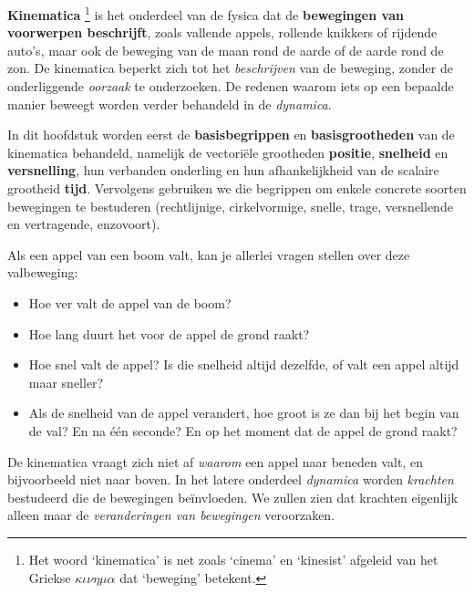 \documentclass{ximera}
\begin{document}
	\author{Bart Lambregs, Vincent Gellens}
    \xmsource\xmuitleg

\textbf{Kinematica}
\footnote{Het woord `kinematica' is net zoals `cinema' en `kinesist' afgeleid van het Griekse $\kappa \iota \nu \eta \mu \alpha$ dat `beweging' betekent.} 
is het onderdeel van de fysica dat de \textbf{bewegingen van voorwerpen beschrijft}, 
zoals vallende appels, rollende knikkers of rijdende auto's, maar ook de beweging van de maan rond de aarde of de aarde rond de zon. 
De kinematica beperkt zich tot het \textit{beschrijven} van de beweging, zonder de onderliggende \textit{oorzaak} te onderzoeken. 
De redenen waarom iets op een bepaalde manier beweegt worden verder behandeld in de \textit{dynamica}.




In dit hoofdstuk worden eerst de \textbf{basisbegrippen} en \textbf{basisgrootheden} van de kinematica behandeld, namelijk de vectoriële grootheden \textbf{positie}, \textbf{snelheid} en \textbf{versnelling}, hun verbanden onderling en hun afhankelijkheid van de scalaire grootheid \textbf{tijd}.
Vervolgens gebruiken we die begrippen om enkele concrete soorten bewegingen te bestuderen (rechtlijnige, cirkelvormige, snelle, trage, versnellende en vertragende, enzovoort).

\begin{example}
Als een appel van een boom valt, kan je allerlei vragen stellen over deze valbeweging: 

\begin{itemize}
	\item Hoe ver valt de appel van de boom?
	\item Hoe lang duurt het voor de appel de grond raakt? 
	\item Hoe snel valt de appel? Is die snelheid altijd dezelfde, of valt een appel altijd maar sneller? 
	\item Als de snelheid van de appel verandert, hoe groot is ze dan bij het begin van de val? En na één seconde? En op het moment dat de appel de grond raakt? 
\end{itemize}

De kinematica vraagt zich niet af \textit{waarom} een appel naar beneden valt, en bijvoorbeeld niet naar boven.
In het latere onderdeel \textit{dynamica} worden \textit{krachten} bestudeerd die de bewegingen beïnvloeden. 
We zullen zien dat krachten eigenlijk alleen maar de \textit{veranderingen van bewegingen} veroorzaken.

\end{example}
\end{document}
